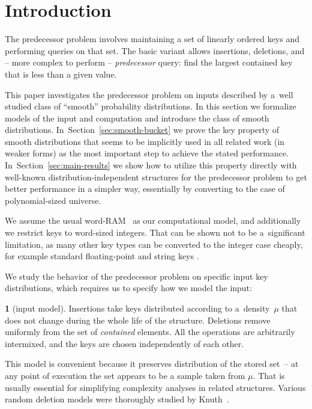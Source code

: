 \documentclass[twoside,english,preprint]{elsarticle}
\theoremstyle{plain}
\theoremstyle{definition}
\newtheorem{defn}[thm]{\protect\definitionname}
\theoremstyle{remark}
\theoremstyle{plain}
\theoremstyle{plain}
\providecommand{\definitionname}{Definition}
\begin{document}

\section{Introduction \label{sec:defs}}

The predecessor problem involves maintaining a set of linearly
ordered keys and performing queries on that set. The basic variant allows insertions, deletions, and -- more complex to perform -- \emph{predecessor} query: find the largest contained key that is less than a given value. 

This paper investigates the predecessor problem on inputs described by  a~well studied class of ``smooth'' probability distributions. 
In this section we formalize models of the input and computation
and introduce the class of smooth distributions. In~Section~\ref{sec:smooth-bucket} we
prove the key property of smooth distributions that seems to be
implicitly used in all related work (in weaker forms) as the most
important step to achieve the stated performance. In~Section~\ref{sec:main-results}
we show how to utilize this property directly with well-known distribution-independent
structures for the predecessor problem to get better performance in
a simpler way, essentially by converting to the case of polynomial-sized
universe.

We assume the usual word-RAM~\cite{HagerupT98}
as our computational model, and additionally we restrict keys to word-sized
integers. That can be shown not to be a~significant limitation, as
many other key types can be converted to the integer case cheaply,
for example standard floating-point \cite[sec. 2.1.3]{Goldberg91}
and string keys \cite{AndersT01}.

We study the behavior of the predecessor problem on specific input
key distributions, which requires us to specify how we model the input:
\begin{defn}[input model]
Insertions take keys distributed according to a~density~$\mu$ that
does not change during the whole life of the structure. Deletions
remove uniformly from the set of \emph{contained} elements. All the
operations are arbitrarily intermixed, and the keys are chosen independently
of each other.
\end{defn}
This model is convenient because it preserves distribution of the
stored set~– at any point of execution the set appears to be a sample
taken from $\mu$. That is usually essential for simplifying complexity
analyses in related structures. Various random deletion models were
thoroughly studied by Knuth~\cite{Knuth77}.
\end{document}
